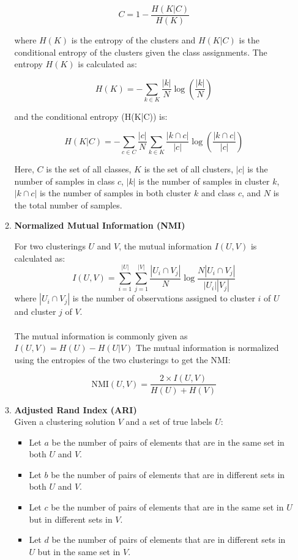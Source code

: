 \documentclass[a4paper,12pt]{article}
\begin{document}
\begin{itemize}
\begin{enumerate}
{			\[ C = 1 - \frac{H(K|C)}{H(K)} \]
			
			where $H(K)$ is the entropy of the clusters and $H(K|C)$ is the conditional entropy of the clusters given the class assignments. The entropy $H(K)$ is calculated as:
			
			\[ H(K) = - \sum_{k \in K} \frac{|k|}{N} \log \left( \frac{|k|}{N} \right) \]
			
			and the conditional entropy (H(K|C)) is:
			
			\[ H(K|C) = - \sum_{c \in C} \frac{|c|}{N} \sum_{k \in K} \frac{|k \cap c|}{|c|} \log \left( \frac{|k \cap c|}{|c|} \right) \]
			
			Here, $C$ is the set of all classes, $K$ is the set of all clusters, $|c|$ is the number of samples in class $c$, $|k|$ is the number of samples in cluster $k$, $|k \cap c|$ is the number of samples in both cluster $k$ and class $c$, and $N$ is the total number of samples.}
		
		\item[]{\textbf{Normalized Mutual Information (NMI)}
		
		For two clusterings $U$ and $V$, the mutual information $I(U, V)$ is calculated as: 
		\[ I(U, V) = \sum_{i=1}^{|U|} \sum_{j=1}^{|V|} \frac{|U_i \cap V_j|}{N} \log \frac{N|U_i \cap V_j|}{|U_i| |V_j|} \] 
		where $|U_i \cap V_j|$ is the number of observations assigned to cluster $i$ of $U$ and cluster $j$ of $V$.\\
		\\
		The mutual information is commonly given as $I(U,V) = H(U) - H(U|V)$
		The mutual information is normalized using the entropies of the two clusterings to get the NMI:
		
		\[\text{NMI}(U, V) = \frac{2 \times I(U, V)}{H(U)+H(V)} \]
	}
		
		\item[]{\textbf{Adjusted Rand Index (ARI)} \\
			Given a clustering solution $V$ and a set of true labels $U$: \\
			\begin{itemize}
				\item Let $a$ be the number of pairs of elements that are in the same set in both $U$ and $V$. \\
				\item Let $b$ be the number of pairs of elements that are in different sets in both $U$ and $V$. \\
				\item Let $c$ be the number of pairs of elements that are in the same set in $U$ but in different sets in $V$.\\
				\item Let $d$ be the number of pairs of elements that are in different sets in $U$ but in the same set in $V$.\\
			\end{itemize}
			
}
\end{enumerate}
\end{itemize}
\end{document}
